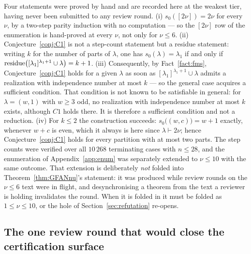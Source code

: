 \begin{remark}\label{rem:C1progress}
Four statements were proved by hand and are recorded here at the weakest tier, having never
been submitted to any review round. (i) $s_0([2\nu]) = 2\nu$ for every $\nu$, by a two-step
parity induction with no computation --- so the $[2\nu]$ row of the enumeration is
hand-proved at every $\nu$, not only for $\nu \le 6$. (ii) Conjecture~\ref{conj:C1} is not a
step-count statement but a residue statement: writing $k$ for the number of parts of
$\lambda$, one has $s_0(\lambda) = \lambda_1$ if and only if
$\operatorname{residue}\bigl([\lambda_1]^{\lambda_1+1} \cup \lambda\bigr) = k+1$. (iii) Consequently, by
Fact~\ref{fact:fms}, Conjecture~\ref{conj:C1} holds for a given $\lambda$ as soon as
$[\lambda_1]^{\lambda_1+1} \cup \lambda$ admits a realization with independence number at
most $k$ --- so the general case acquires a sufficient condition. That condition is
not known to be satisfiable in general: for $\lambda = (w,1)$ with $w \ge 3$ odd, no
realization with independence number at most $k$ exists, although $C1$ holds there.
It is therefore a sufficient condition and not a reduction. (iv) For $k \le 2$
the construction succeeds: $s_0\bigl((w,c)\bigr) = w+1$ exactly, whenever $w+c$ is even,
which it always is here since $\lambda \vdash 2\nu$; hence Conjecture~\ref{conj:C1} holds
for every partition with at most two parts. The step counts were verified over all $10\,268$
terminating cases with $n \le 28$, and the enumeration of Appendix~\ref{app:enum} was
separately extended to $\nu \le 10$ with the same outcome. That extension is deliberately
\emph{not} folded into Theorem~\ref{thm:GFANnu}'s statement: it was produced while review
rounds on the $\nu \le 6$ text were in flight, and desynchronising a theorem from the text a
reviewer is holding invalidates the round. When it is folded in it must be folded as
$1 \le \nu \le 10$, or the hole of Section~\ref{sec:refutation} re-opens.
\end{remark}

\subsection{The one review round that would close the certification surface}
\label{sec:resume}

